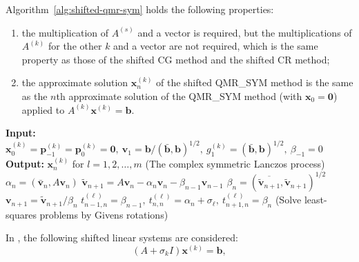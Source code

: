 {Algorithm\ \ref{alg:shifted-qmr-sym} holds the following properties:}
\begin{enumerate}
\item {the multiplication of $A^{(s)}$ and a vector is required, but the multiplications of $A^{(k)}$ for the other $k$ and a vector are not required, which is the same property as those of the shifted CG method and the shifted CR method;}
\item {the approximate solution $\bm x_n^{(k)}$ of the shifted QMR\_SYM method is the same as the $n$th approximate solution of the QMR\_SYM method (with $\bm x_0=\bm0$) applied to $A^{(k)}\bm x^{(k)}=\bm b$.}
\end{enumerate}
\begin{algorithm}[H]\caption{{The shifted QMR\_SYM method (note: $(\bar{\bm a},\bm b)=\bm a^{\top}\bm b$)}}\label{alg:shifted-qmr-sym}\begin{algorithmic}[1]
\Statex\textbf{Input:} $\bm x_0^{(k)}=\bm p_{-1}^{(k)}=\bm p_0^{(k)}=\bm0,\ \bm v_1=\bm b/(\bar{\bm b},\bm b)^{1/2},\ g_1^{(k)}=(\bar{\bm b},\bm b)^{1/2},\ \beta_{-1}=0$
\Statex\textbf{Output:} $\bm x_n^{(k)}$ {for} $l=1,2,\ldots,m$
\State ({The complex symmetric Lanczos process})
\State $\alpha_n=(\bar{\bm v}_n,A\bm v_n)$
\State $\widetilde{\bm v}_{n+1}=A\bm v_n-\alpha_n\bm v_n-\beta_{n-1}\bm v_{n-1}$
\State $\beta_n=(\overline{\widetilde{\bm v}_{n+1}},\widetilde{\bm v}_{n+1})^{1/2}$
\State $\bm v_{n+1}=\widetilde{\bm v}_{n+1}/\beta_n$
\State $t_{n-1,n}^{(\ell)}=\beta_{n-1},\ t_{n,n}^{(\ell)}=\alpha_n+\sigma_{\ell},\ t_{n+1,n}^{(\ell)}=\beta_n$
\State ({Solve least-squares problems by Givens rotations})
\EndFor\end{algorithmic}\end{algorithm}
{In , the following shifted linear systems are considered:}
\begin{equation}\label{eq:hermitian-matrix-complex-shift}(A+\sigma_k I)\bm x^{(k)}=\bm b,\end{equation}
